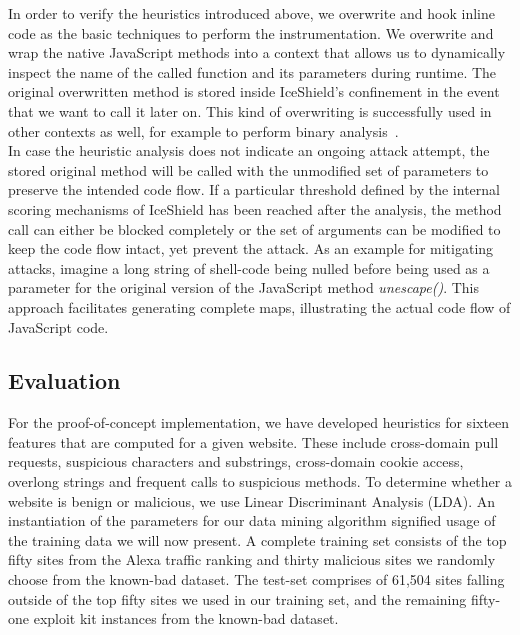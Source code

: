     In order to  verify the heuristics introduced above, we overwrite and hook inline code as the basic techniques to perform the instrumentation. We overwrite and wrap the native JavaScript methods into a context that allows us to dynamically inspect the name of the called function and its parameters during runtime. The original overwritten method is stored inside IceShield's confinement in the event that we want to call it later on. This kind of overwriting is successfully used in other contexts as well, for example to perform binary analysis~\cite{F02,WHF07}.\\

    In case the heuristic analysis does not indicate an ongoing attack attempt, the stored original method will be called with the unmodified set of parameters to preserve the intended code flow. If a particular threshold defined by the internal scoring mechanisms of IceShield has been reached after the analysis, the method call can either be blocked completely or the set of arguments can be modified to keep the code flow intact, yet prevent the attack. As an example for mitigating attacks, imagine a long string of shell-code being nulled before being used as a parameter for the original version of the JavaScript method \textit{unescape()}. This approach facilitates generating complete maps, illustrating the actual code flow of JavaScript code.\\

    \subsection{Evaluation}
    \label{subsubsec:6.5.2.evaluation}

    For the proof-of-concept implementation, we have developed heuristics for sixteen features that are computed for a given website. These include cross-domain pull requests, suspicious characters and substrings, cross-domain cookie access, overlong strings and frequent calls to suspicious methods. 
    To determine whether a website is benign or malicious, we use Linear Discriminant Analysis (LDA). An instantiation of the parameters for our data mining algorithm signified usage of the training data we will now present. A complete training set consists of the top fifty sites from the Alexa traffic ranking and thirty malicious sites we randomly choose from the known-bad dataset. The test-set comprises of 61,504 sites falling outside of the top fifty sites we used in our training set, and the remaining fifty-one exploit kit instances from the known-bad dataset.\\

